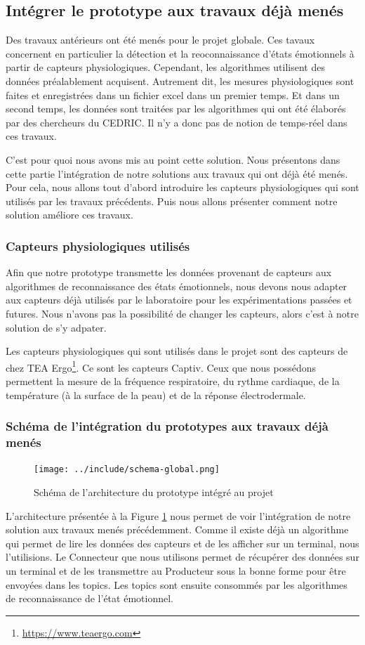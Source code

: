 \documentclass{article}
\begin{document}
	\subsection{Intégrer le prototype aux travaux déjà menés}
		Des travaux antérieurs ont été menés pour le projet globale.
		Ces tavaux concernent en particulier la détection et la reoconnaissance d'états émotionnels à partir de capteurs physiologiques.
		Cependant, les algorithmes utilisent des données préalablement acquisent.
		Autrement dit, les mesures physiologiques sont faites et enregistrées dans un fichier excel dans un premier temps.
		Et dans un second temps, les données sont traitées par les algorithmes qui ont été élaborés par des chercheurs du CEDRIC.
		Il n'y a donc pas de notion de temps-réel dans ces travaux.\par
		C'est pour quoi nous avons mis au point cette solution.
		Nous présentons dans cette partie l'intégration de notre solutions aux travaux qui ont déjà été menés.
		Pour cela, nous allons tout d'abord introduire les capteurs physiologiques qui sont utilisés par les travaux précédents.
		Puis nous allons présenter comment notre solution améliore ces travaux.
		\subsubsection{Capteurs physiologiques utilisés}\label{sec:capteurs}
			Afin que notre prototype transmette les données provenant de capteurs aux algorithmes de reconnaissance des états émotionnels, nous devons nous adapter aux capteurs déjà utilisés par le laboratoire pour les expérimentations passées et futures.
			Nous n'avons pas la possibilité de changer les capteurs, alors c'est à notre solution de s'y adpater.\par
			Les capteurs physiologiques qui sont utilisés dans le projet sont des capteurs de chez TEA Ergo\footnote{\href{https://www.teaergo.com}{https://www.teaergo.com}}.
			Ce sont les capteurs Captiv.
			Ceux que nous possédons permettent la mesure de la fréquence respiratoire, du rythme cardiaque, de la température (à la surface de la peau) et de la réponse électrodermale.
		\subsubsection{Schéma de l'intégration du prototypes aux travaux déjà menés}
			\begin{figure}
				\centering
				\texttt{[image: ../include/schema-global.png]}
				\caption{Schéma de l'architecture du prototype intégré au projet}
				\label{fig:archiglobale}
			\end{figure}
			L'architecture présentée à la Figure \ref{fig:archiglobale} nous permet de voir l'intégration de notre solution aux travaux menés précédemment.
			Comme il existe déjà un algorithme qui permet de lire les données des capteurs et de les afficher sur un terminal, nous l'utilisions.
			Le Connecteur que nous utilisons permet de récupérer des données sur un terminal et de les transmettre au Producteur sous la bonne forme pour être envoyées dans les topics.
			Les topics sont ensuite consommés par les algorithmes de reconnaissance de l'état émotionnel.
\end{document}
